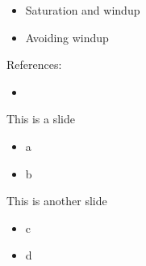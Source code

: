 \documentclass{beamer-control}
\begin{document}

\begin{SUMMARY}
\begin{itemize}
\item Saturation and windup
\item Avoiding windup
\end{itemize}
\vfill References:
\begin{itemize}
\item {}
\end{itemize}
\end{SUMMARY}




\begin{frame}{This is a slide}
\begin{itemize}
\item a
\item b
\end{itemize}
\end{frame}



\begin{frame}{This is another slide}
\begin{itemize}
\item c
\item d
\end{itemize}
\end{frame}


\SUMMARYFRAME
\FINALE
\end{document}
